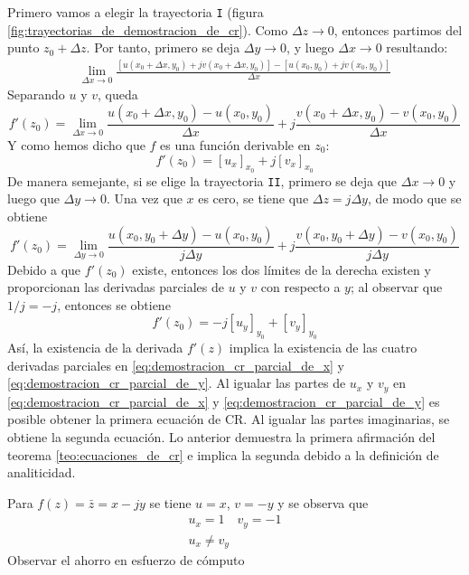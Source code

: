 Primero vamos a elegir la trayectoria \texttt{I} (figura \ref{fig:trayectorias_de_demostracion_de_cr}). Como $\Delta z \to 0$, entonces partimos del punto $z_0+\Delta z$. Por tanto, primero se deja $\Delta y \to 0$, y luego $\Delta x \to 0$ resultando:
\begin{align*}
  \lim_{\Delta x \to 0}\frac{[u(x_0+\Delta x,y_0)+jv(x_0+\Delta x, y_0)]-[u(x_0,y_0)+jv(x_0,y_0)]}{\Delta x}
\end{align*}
Separando $u$ y $v$, queda
\begin{equation*}
  f'(z_0)=\lim_{\Delta x \to 0} \frac{u(x_0+\Delta x,y_0)-u(x_0,y_0)}{\Delta x} + j\frac{v(x_0+\Delta x,y_0)-v(x_0,y_0)}{\Delta x}
\end{equation*}
Y como hemos dicho que $f$ es una función derivable en $z_0$:
\begin{equation}\label{eq:demostracion_cr_parcial_de_x}
  \boxed{f'(z_0)=[u_x]_{x_0} + j[v_x]_{x_0}}
\end{equation}
De manera semejante, si se elige la trayectoria \texttt{II}, primero se deja que $\Delta x \to 0$ y luego que $\Delta y \to 0$. Una vez que $x$ es cero, se tiene que $\Delta z = j\Delta y$, de modo que se obtiene
\begin{equation*}
  f'(z_0) = \lim_{\Delta y \to 0}\frac{u(x_0,y_0+\Delta y)-u(x_0,y_0)}{j\Delta y} + j\frac{v(x_0,y_0+\Delta y)-v(x_0,y_0)}{j\Delta y}
\end{equation*}
Debido a que $f'(z_0)$ existe, entonces los dos límites de la derecha existen y proporcionan las derivadas parciales de $u$ y $v$ con respecto a $y$; al observar que $1/j=-j$, entonces se obtiene
\begin{equation}\label{eq:demostracion_cr_parcial_de_y}
  \boxed{f'(z_0) = -j[u_y]_{y_0} + [v_y]_{y_0}}
\end{equation}
Así, la existencia de la derivada $f'(z)$ implica la existencia de las cuatro derivadas parciales en \ref{eq:demostracion_cr_parcial_de_x} y \ref{eq:demostracion_cr_parcial_de_y}. Al igualar las partes de $u_x$ y $v_y$ en \ref{eq:demostracion_cr_parcial_de_x} y \ref{eq:demostracion_cr_parcial_de_y} es posible obtener la primera ecuación de CR. Al igualar las partes imaginarias, se obtiene la segunda ecuación. Lo anterior demuestra la primera afirmación del teorema \ref{teo:ecuaciones_de_cr} e implica la segunda debido a la definición de analiticidad.

\begin{example}
  Para $f(z)=\bar{z}=x-jy$ se tiene $u=x$, $v=-y$ y se observa que
  \begin{gather*}
    u_x=1 \quad v_y = -1 \\ 
    u_x \neq v_y
  \end{gather*}
  Observar el ahorro en esfuerzo de cómputo
\end{example}

